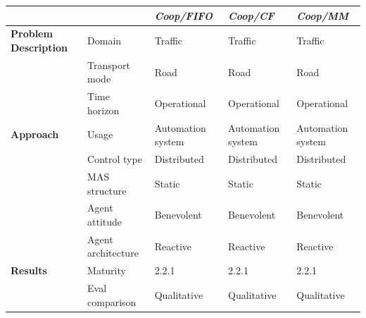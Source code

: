 \documentclass[11pt,letterpaper,onecolumn,twoside,openright,draft]{report}
\begin{document}
\begin{table}[htbp]
  \centering
    \begin{tabular}{|l|p{}|p{}|p{}|p{}|}
    \addlinespace
    \hline
          &       & \emph{\textbf{Coop/FIFO}} & \emph{\textbf{Coop/CF}} & \emph{\textbf{Coop/MM}} \\
          \hline
          \hline
    \textbf{Problem Description} & Domain & Traffic & Traffic & Traffic \\
          \cline{2-5}
          & Transport mode & Road  & Road  & Road \\
          \cline{2-5}
          & Time horizon & Operational & Operational & Operational \\
          \hline
    \textbf{Approach} & Usage & Automation system & Automation system & Automation system \\
          \cline{2-5}
          & Control type & Distributed & Distributed & Distributed \\
          \cline{2-5}
          & MAS structure & Static & Static & Static \\
          \cline{2-5}
          & Agent attitude & Benevolent & Benevolent & Benevolent \\
          \cline{2-5}
          & Agent architecture & Reactive & Reactive & Reactive \\
          \hline
    \textbf{Results} & Maturity & 2.2.1 & 2.2.1 & 2.2.1 \\
          \cline{2-5}
          & Eval comparison & Qualitative & Qualitative & Qualitative \\
          \hline
          \hline
          \cline{2-5}
%

\end{tabular}
\end{table}
\end{document}
